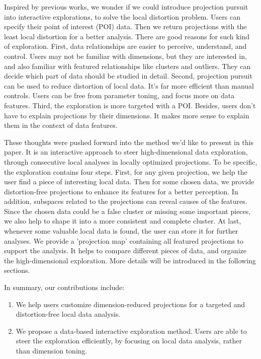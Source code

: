{Inspired by previous works, we wonder if we could introduce projection pursuit into interactive explorations, to solve the local distortion problem. Users can specify their point of interest (POI) data. Then we return projections with the least local distortion for a better analysis. There are good reasons for such kind of exploration. First, data relationships are easier to perceive, understand, and control. Users may not be familiar with dimensions, but they are interested in, and also familiar with featured relationships like clusters and outliers. They can decide which part of data should be studied in detail. Second, projection pursuit can be used to reduce distortion of local data. It's far more efficient than manual controls. Users can be free from parameter toning, and focus more on data features. Third, the exploration is more targeted with a POI. Besides, users don't have to explain projections by their dimensions. It makes more sense to explain them in the context of data features.

These thoughts were pushed forward into the method we'd like to present in this paper. It is an interactive approach to steer high-dimensional data exploration, through consecutive local analyses in locally optimized projections. To be specific, the exploration contains four steps. First, for any given projection, we help the user find a piece of interesting local data. Then for some chosen data, we provide distortion-free projections to enhance its features for a better perception. In addition, subspaces related to the projections can reveal causes of the features. Since the chosen data could be a false cluster or missing some important pieces, we also help to shape it into a more consistent and complete cluster. At last, whenever some valuable local data is found, the user can store it for further analyses. We provide a 'projection map' containing all featured projections to support the analysis. It helps to compare different pieces of data, and organize the high-dimensional exploration. More details will be introduced in the following sections.

In summary, our contributions include:
\begin{enumerate}[(1)]
\item We help users customize dimension-reduced projections for a targeted and distortion-free local data analysis.
\item We propose a data-based interactive exploration method. Users are able to steer the exploration efficiently, by focusing on local data analysis, rather than dimension toning.
\end{enumerate}

}
